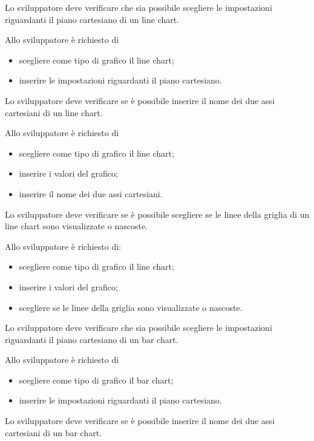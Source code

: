 	Lo sviluppatore deve verificare che sia possibile scegliere le impostazioni riguardanti il piano cartesiano di un line chart.

		Allo sviluppatore è richiesto di
		\begin{itemize}
			\item scegliere come tipo di grafico il line chart;
			\item inserire le impostazioni riguardanti il piano cartesiano.
		\end{itemize}

	Lo sviluppatore deve verificare se è possibile inserire il nome dei due assi cartesiani di un line chart.

		Allo sviluppatore è richiesto di
		\begin{itemize}
			\item scegliere come tipo di grafico il line chart;
			\item inserire i valori del grafico;
			\item inserire il nome dei due assi cartesiani.
		\end{itemize}

	Lo sviluppatore deve verificare se è possibile scegliere se le linee della griglia di un line chart sono visualizzate o nascoste.

		Allo sviluppatore è richiesto di:
		\begin{itemize}
			\item scegliere come tipo di grafico il line chart;
			\item inserire i valori del grafico;
			\item scegliere se le linee della griglia sono visualizzate o nascoste.
		\end{itemize}

	Lo sviluppatore deve verificare che sia possibile scegliere le impostazioni riguardanti il piano cartesiano di un bar chart.

		Allo sviluppatore è richiesto di
		\begin{itemize}
			\item scegliere come tipo di grafico il bar chart;
			\item inserire le impostazioni riguardanti il piano cartesiano.
		\end{itemize}

	Lo sviluppatore deve verificare se è possibile inserire il nome dei due assi cartesiani di un bar chart.

